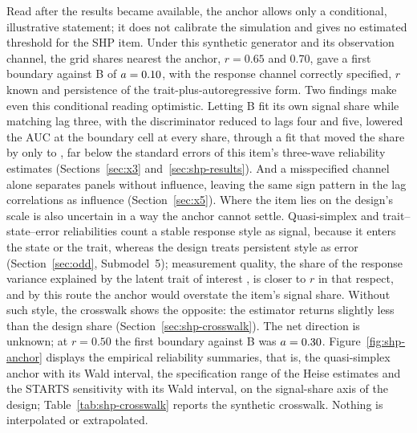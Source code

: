 Read after the results became available, the anchor allows only a conditional, illustrative statement; it does not calibrate the simulation and gives no estimated threshold for the SHP item. Under this synthetic generator and its observation channel, the grid shares nearest the anchor, $r=0.65$ and 0.70, gave a first boundary against B of $a=\resultnum{j.b.r065.first.point}{0.10}$, with the response channel correctly specified, $r$ known and persistence of the trait-plus-autoregressive form. Two findings make even this conditional reading optimistic. Letting B fit its own signal share while matching lag three, with the discriminator reduced to lags four and five, lowered the AUC at the boundary cell at every share, through a fit that moved the share by only  to , far below the standard errors of this item's three-wave reliability estimates (Sections~\ref{sec:x3} and~\ref{sec:shp-results}). And a misspecified channel alone separates panels without influence, leaving the same sign pattern in the lag correlations as influence (Section~\ref{sec:x5}). Where the item lies on the design's scale is also uncertain in a way the anchor cannot settle. Quasi-simplex and trait--state--error reliabilities count a stable response style as signal, because it enters the state or the trait, whereas the design treats persistent style as error (Section~\ref{sec:odd}, Submodel~5); measurement quality, the share of the response variance explained by the latent trait of interest \cite{poses2021,saris2014}, is closer to $r$ in that respect, and by this route the anchor would overstate the item's signal share. Without such style, the crosswalk shows the opposite: the estimator returns slightly less than the design share (Section~\ref{sec:shp-crosswalk}). The net direction is unknown; at $r=0.50$ the first boundary against B was $a=\resultnum{j.b.r050.first.point}{0.30}$.
Figure~\ref{fig:shp-anchor} displays the empirical reliability summaries, that is, the quasi-simplex anchor with its Wald interval, the specification range of the Heise estimates and the STARTS sensitivity with its Wald interval, on the signal-share axis of the design; Table~\ref{tab:shp-crosswalk} reports the synthetic crosswalk. Nothing is interpolated or extrapolated.



\clearpage
